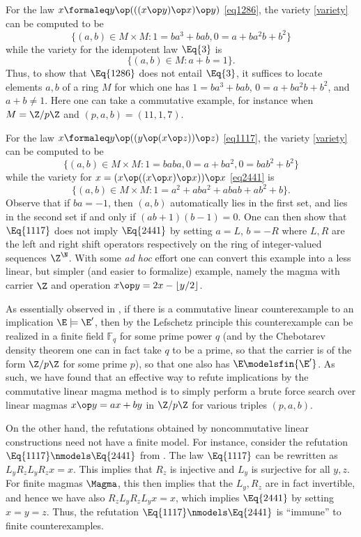\begin{example}\label{1286-ex} For the law $x \formaleq y \op (((x \op y) \op x) \op y)$ \eqref{eq1286}, the variety \eqref{variety} can be computed to be
$$ \{ (a,b) \in M \times M: 1 = ba^3+bab, 0 = a + ba^2 b + b^2 \}$$
while the variety for the idempotent law $\Eq{3}$ is
$$ \{ (a,b) \in M: a+b=1 \}.$$
Thus, to show that $\Eq{1286}$ does not entail $\Eq{3}$, it suffices to locate elements $a,b$ of a ring $M$ for which one has $1 = ba^3+bab$, $0 = a + ba^2 b + b^2$, and $a+b \neq 1$.  Here one can take a commutative example, for instance when $M = \Z/p\Z$ and $(p,a,b) = (11,1,7)$.
\end{example}

\begin{example}\label{1117-ex} For the law $x \formaleq y \op ((y \op (x \op z)) \op z)$ \eqref{eq1117}, the variety \eqref{variety} can be computed to be
$$ \{ (a,b) \in M \times M: 1 = baba, 0 = a+ba^2, 0 = bab^2 + b^2 \}$$
while the variety for $x = (x \op ((x \op x) \op x)) \op x$ \eqref{eq2441} is
$$ \{ (a,b) \in M \times M: 1 = a^2 + aba^2 + abab + ab^2 + b \}.$$
Observe that if $ba = -1$, then $(a,b)$ automatically lies in the first set, and lies in the second set if and only if $(ab+1)(b-1) = 0$.  One can then show that $\Eq{1117}$ does not imply $\Eq{2441}$ by setting $a = L$, $b = -R$ where $L, R$ are the left and right shift operators respectively on the ring of integer-valued sequences $\Z^\N$.  With some \emph{ad hoc} effort one can convert this example into a less linear, but simpler (and easier to formalize) example, namely the magma with carrier $\Z$ and operation $x \op y = 2x - \lfloor y/2 \rfloor$.
\end{example}

\begin{remark} As essentially observed in \cite{austin}, if there is a commutative linear counterexample to an implication $\E \models {\E'}$, then by the Lefschetz principle this counterexample can be realized in a finite field ${\mathbb F}_q$ for some prime power $q$ (and by the Chebotarev density theorem one can in fact take $q$ to be a prime, so that the carrier is of the form $\Z/p\Z$ for some prime $p$), so that one also has $\E \modelsfin {\E'}$.  As such, we have found that an effective way to refute implications by the commutative linear magma method is to simply perform a brute force search over linear magmas $x \op y = ax + by$ in $\Z/p\Z$ for various triples $(p,a,b)$.

On the other hand, the refutations obtained by noncommutative linear constructions need not have a finite model.  For instance, consider the refutation $\Eq{1117} \nmodels \Eq{2441}$ from .  The law $\Eq{1117}$ can be rewritten as $L_y R_z L_y R_z x = x$.  This implies that $R_z$ is injective and $L_y$ is surjective for all $y,z$.  For finite magmas $\Magma$, this then implies that the $L_y, R_z$ are in fact invertible, and hence we have also $R_z L_y R_z L_y x = x$, which implies $\Eq{2441}$ by setting $x=y=z$.  Thus, the refutation $\Eq{1117} \nmodels \Eq{2441}$ is ``immune'' to finite counterexamples.
\end{remark}

